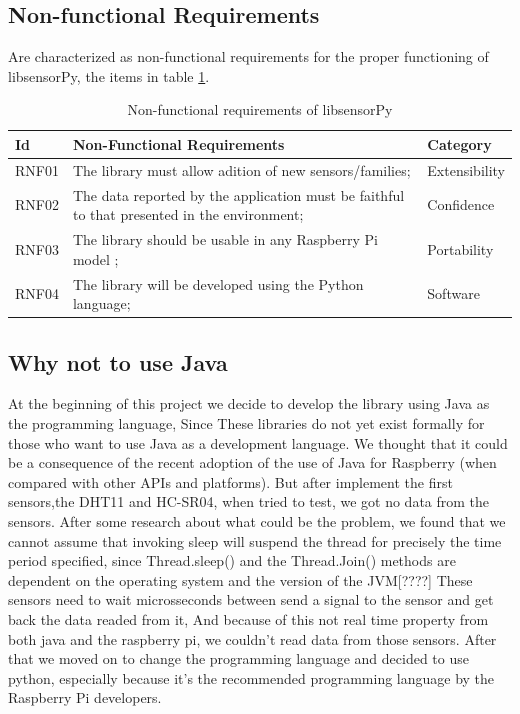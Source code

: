 \documentclass{acm_proc_article-sp}
\begin{document}
\subsection{Non-functional Requirements}
Are characterized as non-functional requirements for the proper functioning of libsensorPy, the items in table \ref{table:rnf}.

\begin{table}[h]
 \caption{Non-functional requirements of libsensorPy}
 \label{table:rnf}
 \begin{tabular}{|l|p{4.7cm}|l|}
 \hline  
 Id & Non-Functional Requirements & Category \\
 \hline  
 RNF01 & The library must allow adition of new sensors/families; & Extensibility\\
 \hline  
 RNF02 & The data reported by the application must be faithful to that presented in the environment; & Confidence \\
 \hline 
 RNF03 & The library should be usable in any Raspberry Pi model ; & Portability \\
 \hline 
 RNF04 & The library will be developed using the Python language; & Software \\
\hline  
\end{tabular}
\end{table}

\subsection{Why not to use Java}
At the beginning of this project we decide to develop the library using Java as the programming language, Since These libraries do not yet exist formally for those who want to use Java as a development language. We thought that it could be a consequence of the recent adoption of the use of Java for Raspberry (when compared with other APIs and platforms). But after implement the first sensors,the DHT11 and HC-SR04, when tried to test, we got no data from the sensors.
\newline
\newline
After some research about what could be the problem, we found that we cannot assume that invoking sleep will suspend the thread for precisely the time period specified, since Thread.sleep() and the Thread.Join() methods are dependent on the operating system and the version of the JVM[????]
\newline
\newline
These sensors need to wait microsseconds between send a signal to the sensor and get back the data readed from it, And because of this not real time property from both java and the raspberry pi, we couldn’t read data from those sensors. After that we moved on to change the programming language and decided to use python, especially because it’s the recommended programming language by the Raspberry Pi developers.
\end{document}
